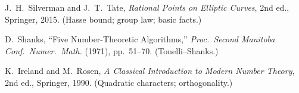 \documentclass[11pt]{article}
\begin{document}
\begin{thebibliography}{9}
J.~H.~Silverman and J.~T.~Tate, \emph{Rational Points on Elliptic Curves}, 2nd ed., Springer, 2015. (Hasse bound; group law; basic facts.)

D.~Shanks, ``Five Number-Theoretic Algorithms,'' \emph{Proc.\ Second Manitoba Conf.\ Numer.\ Math.} (1971), pp.~51--70. (Tonelli--Shanks.)

K.~Ireland and M.~Rosen, \emph{A Classical Introduction to Modern Number Theory}, 2nd ed., Springer, 1990. (Quadratic characters; orthogonality.)
\end{thebibliography}
\end{document}
